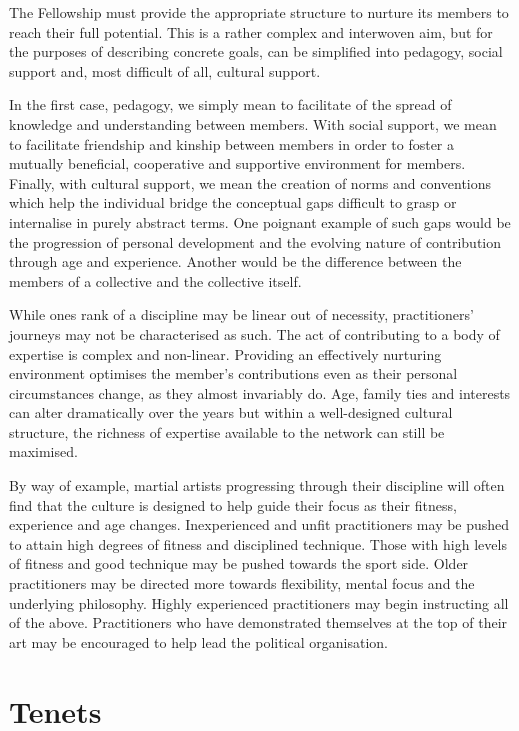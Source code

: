 \documentclass[9pt,oneside]{amsart}
\begin{document}
The Fellowship must provide the appropriate structure to nurture its members to reach their full potential. This is a rather complex and interwoven aim, but for the purposes of describing concrete goals, can be simplified into pedagogy, social support and, most difficult of all, cultural support.

In the first case, pedagogy, we simply mean to facilitate of the spread of knowledge and understanding between members. With social support, we mean to facilitate friendship and kinship between members in order to foster a mutually beneficial, cooperative and supportive environment for members. Finally, with cultural support, we mean the creation of norms and conventions which help the individual bridge the conceptual gaps difficult to grasp or internalise in purely abstract terms. One poignant example of such gaps would be the progression of personal development and the evolving nature of contribution through age and experience. Another would be the difference between the members of a collective and the collective itself.

While ones rank of a discipline may be linear out of necessity, practitioners' journeys may not be  characterised as such. The act of contributing to a body of expertise is complex and non-linear. Providing an effectively nurturing environment optimises the member's contributions even as their personal circumstances change, as they almost invariably do. Age, family ties and interests can alter dramatically over the years but within a well-designed cultural structure, the richness of expertise available to the network can still be maximised.

By way of example, martial artists progressing through their discipline will often find that the culture is designed to help guide their focus as their fitness, experience and age changes. Inexperienced and unfit practitioners may be pushed to attain high degrees of fitness and disciplined technique. Those with high levels of fitness and good technique may be pushed towards the sport side. Older practitioners may be directed more towards flexibility, mental focus and the underlying philosophy. Highly experienced practitioners may begin instructing all of the above. Practitioners who have demonstrated themselves at the top of their art may be encouraged to help lead the political organisation.

\section{Tenets}
\end{document}
